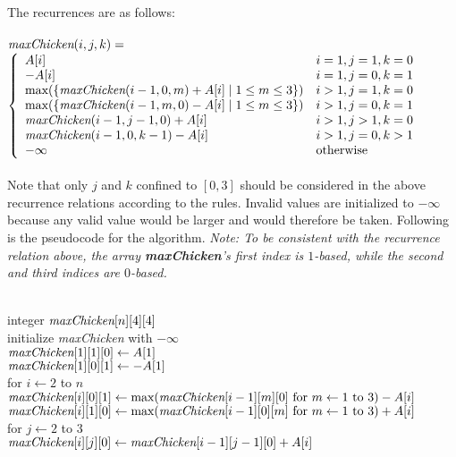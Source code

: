 \documentclass[11pt]{article}
\begin{document}
\begin{solution}
\begin{itemize}
\begin{itemize}
\end{itemize}
\end{itemize}
The recurrences are as follows:\\\\
$\emph{maxChicken}(i,j,k)=$\\
\begin{math}
  \left\{
    \begin{array}{ll}
		A[i]&i=1,j=1,k=0\\
		-A[i]&i=1,j=0,k=1\\
		\text{max}(\{\emph{maxChicken}(i-1, 0, m)+A[i]\mid 1\le m \le 3\})&i>1,j=1,k=0\\
		\text{max}(\{\emph{maxChicken}(i-1, m, 0)-A[i]\mid 1\le m \le 3\})&i>1,j=0,k=1\\
		\emph{maxChicken}(i-1, j-1, 0)+A[i]&i>1,j>1,k=0\\
		\emph{maxChicken}(i-1, 0, k-1)-A[i]&i>1,j=0,k>1\\
		-\infty&\text{otherwise}
    \end{array}
  \right.
\end{math}\\\\
Note that only $j$ and $k$ confined to $[0,3]$ should be considered in the above recurrence relations according to the rules. Invalid values are initialized to $-\infty$ because any valid value would be larger and would therefore be taken. Following is the pseudocode for the algorithm. \emph{Note: To be consistent with the recurrence relation above, the array \textbf{maxChicken}'s first index is $1$-based, while the second and third indices are $0$-based.}
\begin{algo}
	\textsc{}\+
\\	integer $\emph{maxChicken}[n][4][4]$
\\	initialize \emph{maxChicken} with $-\infty$
\\	$\emph{maxChicken}[1][1][0]\gets A[1]$
\\	$\emph{maxChicken}[1][0][1]\gets -A[1]$
\\	for $i\gets 2$ to $n$\+
\\	$\emph{maxChicken}[i][0][1]\gets \text{max}(\emph{maxChicken}[i-1][m][0]\text{ for $m\gets 1$ to $3$}) - A[i]$
\\	$\emph{maxChicken}[i][1][0]\gets \text{max}(\emph{maxChicken}[i-1][0][m]\text{ for $m\gets 1$ to $3$}) + A[i]$
\\	for $j\gets 2$ to $3$\+
\\	$\emph{maxChicken}[i][j][0]\gets \emph{maxChicken}[i-1][j-1][0] + A[i]$\-

\end{algo}
\end{solution}
\end{document}
